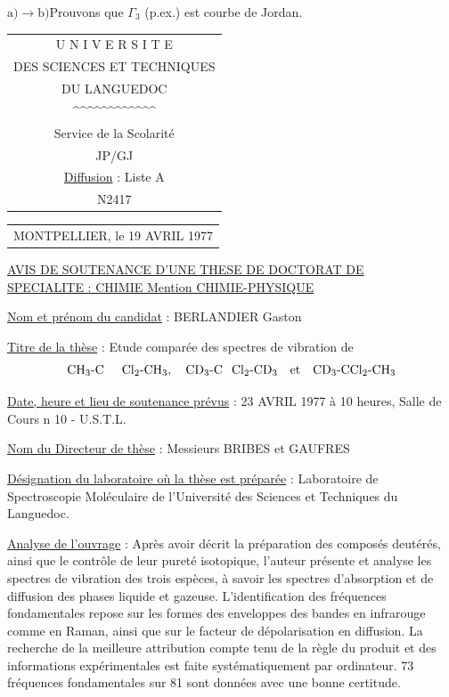 $\mathrm{a)}\longrightarrow\mathrm{b)}$\qquad Prouvons que $\Gamma_3$ (p.ex.) est courbe de Jordan.

\noindent\begin{tabular}[t]{@{}c@{}}
U N I V E R S I T E\\
DES SCIENCES ET TECHNIQUES\\
DU LANGUEDOC\\
\textasciicircum\textasciicircum\textasciicircum\textasciicircum\textasciicircum\textasciicircum\textasciicircum\textasciicircum\textasciicircum\textasciicircum\textasciicircum\textasciicircum\\[3pt]
Service de la Scolarité\\
JP/GJ\\[3pt]
\uline{Diffusion} : Liste A\\
N\textdegree{}2417
\end{tabular}\hfill\begin{tabular}[t]{@{}l@{}}
MONTPELLIER, le 19 AVRIL 1977\\
\end{tabular}

\begin{center}
\uline{AVIS DE SOUTENANCE D'UNE THESE DE DOCTORAT DE}\\[3pt]
\uline{SPECIALITE : CHIMIE Mention CHIMIE-PHYSIQUE}
\end{center}

\uline{Nom et prénom du candidat} : BERLANDIER Gaston

\uline{Titre de la thèse} : Etude comparée des spectres de vibration de
\[
\mathrm{CH}_{3}\text{-}\mathrm{C}\hphantom{\mathrm{CC}}\mathrm{Cl}_{2}\text{-}\mathrm{CH}_{3},\quad
\mathrm{CD}_{3}\text{-}\mathrm{C}\hphantom{\mathrm{C}}\mathrm{Cl}_{2}\text{-}\mathrm{CD}_{3}
\quad\text{et}\quad\mathrm{CD}_{3}\text{-}\mathrm{CCl}_{2}\text{-}\mathrm{CH}_{3}
\]

\uline{Date, heure et lieu de soutenance prévus} : 23 AVRIL 1977 à 10 heures, Salle de Cours n\textdegree{} 10 - U.S.T.L.

\uline{Nom du Directeur de thèse} : Messieurs BRIBES et GAUFRES

\uline{Désignation du laboratoire où la thèse est préparée} : Laboratoire de Spectroscopie Moléculaire de l'Université des Sciences et Techniques du Languedoc.

\uline{Analyse de l'ouvrage} : Après avoir décrit la préparation des composés deutérés, ainsi que le contrôle de leur pureté isotopique, l'auteur présente et analyse les spectres de vibration des trois espèces, à savoir les spectres d'absorption et de diffusion des phases liquide et gazeuse. L'identification des fréquences fondamentales repose sur les formes des enveloppes des bandes en infrarouge comme en Raman, ainsi que sur le facteur de dépolarisation en diffusion. La recherche de la meilleure attribution compte tenu de la règle du produit et des informations expérimentales est faite systématiquement par ordinateur. 73 fréquences fondamentales sur 81 sont données avec une bonne certitude.

